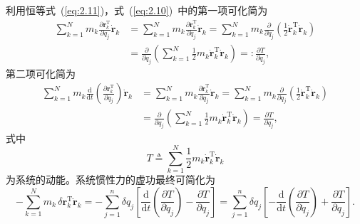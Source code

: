 利用恒等式~(\ref{eq:2.11})，式~(\ref{eq:2.10})~中的第一项可化简为
\begin{equation}\label{eq:2.12}
\begin{aligned}
\sum_{k=1}^{N} m_k \frac{\partial \boldsymbol{r}_k^{\mathrm{T}}}{\partial q_j} \dot{\boldsymbol{r}}_k
&= \sum_{k=1}^{N} m_k \frac{\partial \dot{\boldsymbol{r}}_k^{\mathrm{T}}}{\partial \dot{q}_j} \dot{\boldsymbol{r}}_k
= \sum_{k=1}^{N} m_k \frac{\partial}{\partial \dot{q}_j}\!\left(\frac{1}{2} \dot{\boldsymbol{r}}_k^{\mathrm{T}} \dot{\boldsymbol{r}}_k\right) \\
&= \frac{\partial}{\partial \dot{q}_j}\!\left(\sum_{k=1}^{N} \frac{1}{2} m_k \dot{\boldsymbol{r}}_k^{\mathrm{T}} \dot{\boldsymbol{r}}_k\right)
=: \frac{\partial T}{\partial \dot{q}_j},
\end{aligned}
\end{equation}
第二项可化简为
\begin{equation}\label{eq:2.13}
\begin{aligned}
\sum_{k=1}^{N} m_k \frac{\mathrm{d}}{\mathrm{d}t}\!\left(\frac{\partial \boldsymbol{r}_k^{\mathrm{T}}}{\partial q_j}\right) \dot{\boldsymbol{r}}_k
&= \sum_{k=1}^{N} m_k \frac{\partial \dot{\boldsymbol{r}}_k^{\mathrm{T}}}{\partial q_j} \dot{\boldsymbol{r}}_k
= \sum_{k=1}^{N} m_k \frac{\partial}{\partial q_j}\!\left(\frac{1}{2} \dot{\boldsymbol{r}}_k^{\mathrm{T}} \dot{\boldsymbol{r}}_k\right) \\
&= \frac{\partial}{\partial q_j}\!\left(\sum_{k=1}^{N} \frac{1}{2} m_k \dot{\boldsymbol{r}}_k^{\mathrm{T}} \dot{\boldsymbol{r}}_k\right)
= \frac{\partial T}{\partial q_j},
\end{aligned}
\end{equation}
式中
\begin{equation}\label{eq:2.14}
T \triangleq \sum_{k=1}^{N} \frac{1}{2} m_k \dot{\boldsymbol{r}}_k^{\mathrm{T}} \dot{\boldsymbol{r}}_k
\end{equation}
为系统的动能。系统惯性力的虚功最终可简化为
\begin{equation}\label{eq:2.15}
-\sum_{k=1}^{N} m_k \,\delta\boldsymbol{r}_k^{\mathrm{T}} \ddot{\boldsymbol{r}}_k = -\sum_{j=1}^{n} \delta q_j \!\left[ \frac{\mathrm{d}}{\mathrm{d}t}\!\left(\frac{\partial T}{\partial \dot{q}_j}\right) - \frac{\partial T}{\partial q_j} \right] = \sum_{j=1}^{n} \delta q_j \!\left[ -\frac{\mathrm{d}}{\mathrm{d}t}\!\left(\frac{\partial T}{\partial \dot{q}_j}\right) + \frac{\partial T}{\partial q_j} \right].
\end{equation}

